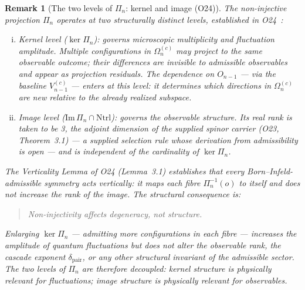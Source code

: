 \documentclass[11pt,a4paper]{article}
\newtheorem{remark}[theorem]{Remark}
\begin{document}
    \begin{remark}[The two levels of $\Pi_n$: kernel and image (O24)]
      \label{rem:pi-two-levels}
      The non-injective projection $\Pi_n$ operates at two structurally distinct
      levels, established in O24~\cite{Beau2026a28}:
      \begin{enumerate}[(i)]
  \item \emph{Kernel level} ($\ker \Pi_n$): governs microscopic multiplicity
  and fluctuation amplitude.
  Multiple configurations in $\Omega_n^{(c)}$ may project to the same
  observable outcome; their differences are invisible to admissible
  observables and appear as projection residuals.
  The dependence on $O_{n-1}$ — via the baseline $V_{n-1}^{(c)}$ — enters
  at this level: it determines which directions in $\Omega_n^{(c)}$ are
  new relative to the already realized subspace.
  \item \emph{Image level} ($\mathrm{Im}\,\Pi_n \cap \mathrm{Ntrl}$):
  governs the observable structure.
  Its real rank is taken to be 3, the adjoint dimension of the supplied
  spinor carrier (O23, Theorem~3.1) — a supplied selection rule whose
  derivation from admissibility is open — and is independent of the
  cardinality of $\ker \Pi_n$.
      \end{enumerate}
      The Verticality Lemma of O24 (Lemma~3.1) establishes that every
      Born--Infeld-admissible symmetry acts vertically: it maps each fibre
      $\Pi_n^{-1}(o)$ to itself and does not increase the rank of the image.
      The structural consequence is:
      \begin{quote}
        \emph{Non-injectivity affects degeneracy, not structure.}
      \end{quote}
      Enlarging $\ker \Pi_n$ — admitting more configurations in each fibre —
      increases the amplitude of quantum fluctuations but does not alter the
      observable rank, the cascade exponent $\delta_{\mathrm{pair}}$, or any
      other structural invariant of the admissible sector.
      The two levels of $\Pi_n$ are therefore decoupled: kernel structure is
      physically relevant for fluctuations; image structure is physically
      relevant for observables.
    \end{remark}
\end{document}
